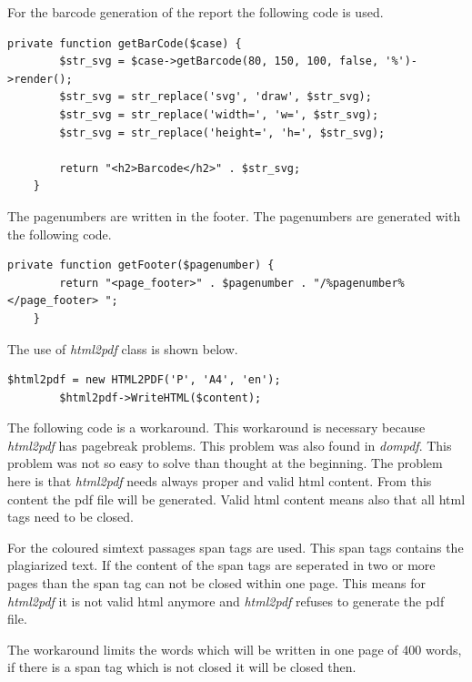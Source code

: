 For the barcode generation of the report the following code is used.

\begin{lstlisting}[caption=Generating the barcode for the report]
  private function getBarCode($case) {
        $str_svg = $case->getBarcode(80, 150, 100, false, '%')->render();
        $str_svg = str_replace('svg', 'draw', $str_svg);
        $str_svg = str_replace('width=', 'w=', $str_svg);
        $str_svg = str_replace('height=', 'h=', $str_svg);

        return "<h2>Barcode</h2>" . $str_svg;
    }
\end{lstlisting}

The pagenumbers are written in the footer. The pagenumbers are generated with the following code.

\begin{lstlisting}[caption=Generating the pagenumbers]
    private function getFooter($pagenumber) {
        return "<page_footer>" . $pagenumber . "/%pagenumber%</page_footer> ";
    }
\end{lstlisting}

The use of \textit{html2pdf} class is shown below.

\begin{lstlisting}[caption=Use of the class html2pdf]
        $html2pdf = new HTML2PDF('P', 'A4', 'en');
        $html2pdf->WriteHTML($content);
\end{lstlisting}

The following code is a workaround. This workaround is necessary because \textit{html2pdf} has pagebreak problems. This problem was also found in \textit{dompdf}. This problem was not so easy to solve than thought at the beginning. The problem here is that  \textit{html2pdf} needs always proper and valid html content. From this content the pdf file will be generated. Valid html content means also that all html tags need to be closed. 

For the coloured simtext passages span tags are used. This span tags contains the plagiarized text. If the content of the span tags are seperated in two or more pages than the span tag can not be closed within one page. This means for \textit{html2pdf} it is not valid html anymore and \textit{html2pdf} refuses to generate the pdf file.

The workaround limits the words which will be written in one page of 400 words, if there is a span tag which is not closed it will be closed then.

